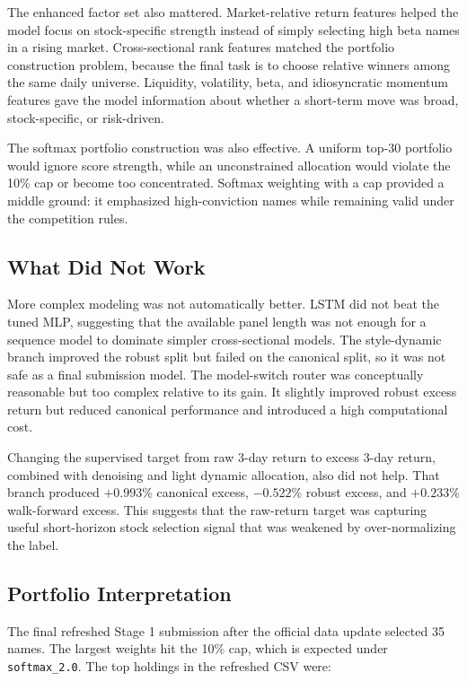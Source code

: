 \documentclass[11pt]{article}
\begin{document}
The enhanced factor set also mattered. Market-relative return features helped
the model focus on stock-specific strength instead of simply selecting high
beta names in a rising market. Cross-sectional rank features matched the
portfolio construction problem, because the final task is to choose relative
winners among the same daily universe. Liquidity, volatility, beta, and
idiosyncratic momentum features gave the model information about whether a
short-term move was broad, stock-specific, or risk-driven.

The softmax portfolio construction was also effective. A uniform top-30
portfolio would ignore score strength, while an unconstrained allocation would
violate the 10\% cap or become too concentrated. Softmax weighting with a cap
provided a middle ground: it emphasized high-conviction names while remaining
valid under the competition rules.

\subsection{What Did Not Work}

More complex modeling was not automatically better. LSTM did not beat the tuned
MLP, suggesting that the available panel length was not enough for a sequence
model to dominate simpler cross-sectional models. The style-dynamic branch
improved the robust split but failed on the canonical split, so it was not safe
as a final submission model. The model-switch router was conceptually
reasonable but too complex relative to its gain. It slightly improved robust
excess return but reduced canonical performance and introduced a high
computational cost.

Changing the supervised target from raw 3-day return to excess 3-day return,
combined with denoising and light dynamic allocation, also did not help. That
branch produced \(+0.993\%\) canonical excess, \(-0.522\%\) robust excess, and
\(+0.233\%\) walk-forward excess. This suggests that the raw-return target was
capturing useful short-horizon stock selection signal that was weakened by
over-normalizing the label.

\subsection{Portfolio Interpretation}

The final refreshed Stage 1 submission after the official data update selected
35 names. The largest weights hit the 10\% cap, which is expected under
\texttt{softmax\_2.0}. The top holdings in the refreshed CSV were:
\end{document}
